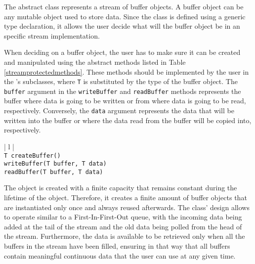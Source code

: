 The \Stream{} abstract class represents a stream of buffer objects. A buffer object can be any mutable object 
used to store data. Since the \Stream{} class is defined using a generic type declaration, it allows the user
decide what will the buffer object be in an specific stream implementation. 

When deciding on a buffer object, the user has to make sure it can be created and manipulated using the 
abstract methods listed in Table \ref{streamprotectedmethods}. These methods should be implemented by 
the user in the \Stream{}'s subclasses, where \texttt{T} is substituted by the type of the buffer object. The 
\texttt{buff\-er} argument in the \texttt{write\-Buff\-er} and \texttt{read\-Buff\-er} methods represents the buffer
where data is going to be written or from where data is going to be read, respectively. Conversely, the 
\texttt{da\-ta} argument represents the data that will be written into the buffer or where the data read from the 
buffer will be copied into, respectively.

\begin{table}[ht]
\caption{Abstract methods that define the buffer object in the \Stream{} class}
\begin{center}
\begin{tabular}{| l |}
	\hline 
	 \\
	\hline \hline
	\texttt{T createBuffer()} \\
	\texttt{writeBuffer(T buffer, T data)} \\
	\texttt{readBuffer(T buffer, T data)} \\
	\hline
\end{tabular}
\end{center}
\label{streamprotectedmethods}
\end{table}

The \Stream{} object is created with a finite capacity that remains constant during the lifetime of the object. 
Therefore, it creates a finite amount of buffer objects that are instantiated only once and always reused 
afterwards. The \Stream{} class' design allows to operate similar to a First-In-First-Out queue, with the 
incoming data being added at the tail of the stream and the old data being polled from the head of the stream. 
Furthermore, the data is available to be retrieved only when all the buffers in the stream have been filled, 
ensuring in that way that all buffers contain meaningful continuous data that the user can use at any given 
time.

